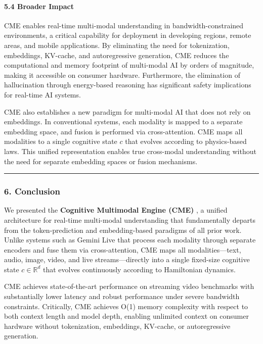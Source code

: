 \documentclass[
  11pt,
  a4paper,
]{article}
\begin{document}
\paragraph{5.4 Broader Impact}\label{broader-impact}

CME enables real-time multi-modal understanding in bandwidth-constrained
environments, a critical capability for deployment in developing
regions, remote areas, and mobile applications. By eliminating the need
for tokenization, embeddings, KV-cache, and autoregressive generation,
CME reduces the computational and memory footprint of multi-modal AI by
orders of magnitude, making it accessible on consumer hardware.
Furthermore, the elimination of hallucination through energy-based
reasoning has significant safety implications for real-time AI systems.

CME also establishes a new paradigm for multi-modal AI that does not
rely on embeddings. In conventional systems, each modality is mapped to
a separate embedding space, and fusion is performed via cross-attention.
CME maps all modalities to a single cognitive state \(c\) that evolves
according to physics-based laws. This unified representation enables
true cross-modal understanding without the need for separate embedding
spaces or fusion mechanisms.

\begin{center}\rule{0.5\linewidth}{0.5pt}\end{center}

\subsubsection{6. Conclusion}\label{conclusion-5}

We presented the \textbf{Cognitive Multimodal Engine (CME)} , a unified
architecture for real-time multi-modal understanding that fundamentally
departs from the token-prediction and embedding-based paradigms of all
prior work. Unlike systems such as Gemini Live that process each
modality through separate encoders and fuse them via cross-attention,
CME maps all modalities---text, audio, image, video, and live
streams---directly into a single fixed-size cognitive state
\(c \in \mathbb{R}^{d}\) that evolves continuously according to
Hamiltonian dynamics.

CME achieves state-of-the-art performance on streaming video benchmarks
with substantially lower latency and robust performance under severe
bandwidth constraints. Critically, CME achieves O(1) memory complexity
with respect to both context length and model depth, enabling unlimited
context on consumer hardware without tokenization, embeddings, KV-cache,
or autoregressive generation.
\end{document}
